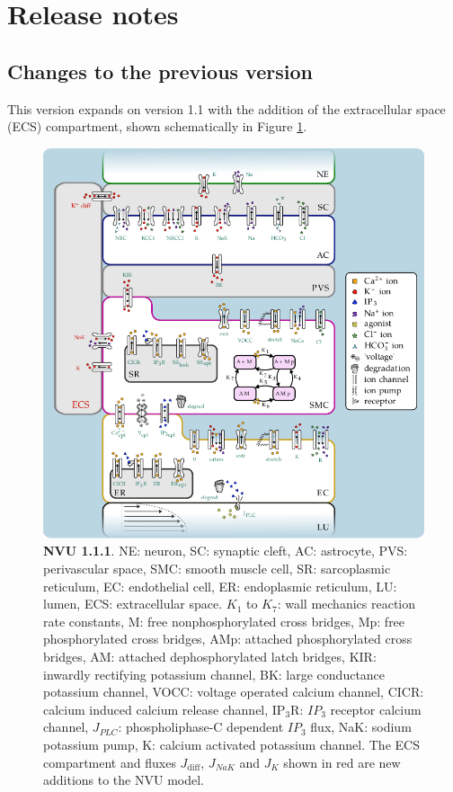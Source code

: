 \section{Release notes}

\subsection{Changes to the previous version}

This version expands on version 1.1 with the addition of the extracellular space (ECS) compartment, shown schematically in Figure \ref{fig:nvu_ecs}.

	\begin{figure}[p!]
		\centering
		\includegraphics[width=1\linewidth]{new_figures/nvu_ecs}
		\caption{\textbf{NVU 1.1.1}. NE: neuron, SC: synaptic cleft, AC: astrocyte, PVS: perivascular space, SMC: smooth muscle cell, SR: sarcoplasmic reticulum, EC: endothelial cell, ER: endoplasmic reticulum, LU: lumen, ECS: extracellular space. $K_1$ to $K_7$: wall mechanics reaction rate constants, M: free nonphosphorylated cross bridges, Mp: free phosphorylated cross bridges, AMp: attached phosphorylated cross bridges, AM: attached dephosphorylated latch bridges, KIR: inwardly rectifying potassium channel, BK: large conductance potassium channel, VOCC: voltage operated calcium channel, CICR: calcium induced calcium release channel, IP$_3$R: $IP_3$ receptor calcium channel, $J_{PLC}$: phospholiphase-C dependent $IP_3$ flux, NaK: sodium potassium pump, K: calcium activated potassium channel. 
		The ECS compartment and fluxes $J_{\text{diff}}$, $J_{NaK}$ and $J_K$ shown in red are new additions to the NVU model.
		}
		\label{fig:nvu_ecs}
		\end{figure}
		
